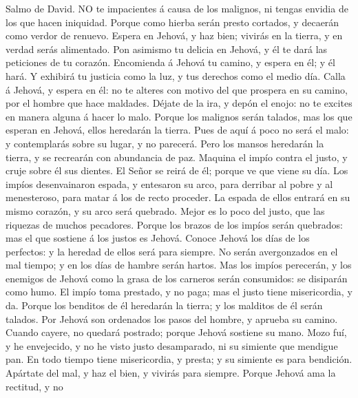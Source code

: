  Salmo de David. NO te impacientes á causa de los malignos,
ni tengas envidia de los que hacen iniquidad.  Porque como
hierba serán presto cortados, y decaerán como verdor de renuevo.
 Espera en Jehová, y haz bien; vivirás en la tierra, y en
verdad serás alimentado.  Pon asimismo tu delicia en Jehová,
y él te dará las peticiones de tu corazón.  Encomienda á
Jehová tu camino, y espera en él; y él hará.  Y exhibirá tu
justicia como la luz, y tus derechos como el medio día. 
Calla á Jehová, y espera en él: no te alteres con motivo del que
prospera en su camino, por el hombre que hace maldades. 
Déjate de la ira, y depón el enojo: no te excites en manera alguna á
hacer lo malo.  Porque los malignos serán talados, mas los
que esperan en Jehová, ellos heredarán la tierra.  Pues de
aquí á poco no será el malo: y contemplarás sobre su lugar, y no
parecerá.  Pero los mansos heredarán la tierra, y se
recrearán con abundancia de paz.  Maquina el impío contra
el justo, y cruje sobre él sus dientes.  El Señor se reirá
de él; porque ve que viene su día.  Los impíos
desenvainaron espada, y entesaron su arco, para derribar al pobre y al
menesteroso, para matar á los de recto proceder.  La espada
de ellos entrará en su mismo corazón, y su arco será quebrado.
 Mejor es lo poco del justo, que las riquezas de muchos
pecadores.  Porque los brazos de los impíos serán
quebrados: mas el que sostiene á los justos es Jehová. 
Conoce Jehová los días de los perfectos: y la heredad de ellos será para
siempre.  No serán avergonzados en el mal tiempo; y en los
días de hambre serán hartos.  Mas los impíos perecerán, y
los enemigos de Jehová como la grasa de los carneros serán consumidos:
se disiparán como humo.  El impío toma prestado, y no paga;
mas el justo tiene misericordia, y da.  Porque los benditos
de él heredarán la tierra; y los malditos de él serán talados.
 Por Jehová son ordenados los pasos del hombre, y aprueba
su camino.  Cuando cayere, no quedará postrado; porque
Jehová sostiene su mano.  Mozo fuí, y he envejecido, y no
he visto justo desamparado, ni su simiente que mendigue pan.
 En todo tiempo tiene misericordia, y presta; y su simiente
es para bendición.  Apártate del mal, y haz el bien, y
vivirás para siempre.  Porque Jehová ama la rectitud, y no
